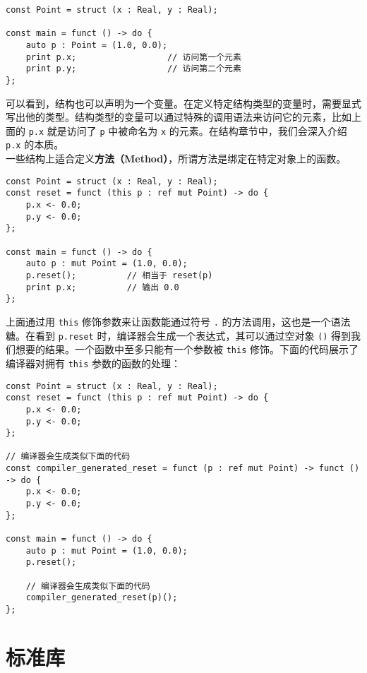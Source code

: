 \begin{lstlisting}
const Point = struct (x : Real, y : Real);

const main = funct () -> do {
    auto p : Point = (1.0, 0.0);
    print p.x;					// 访问第一个元素
    print p.y;					// 访问第二个元素
};
\end{lstlisting}

可以看到，结构也可以声明为一个变量。在定义特定结构类型的变量时，需要显式写出他的类型。结构类型的变量可以通过特殊的调用语法来访问它的元素，比如上面的 \lstinline!p.x! 就是访问了 \lstinline!p! 中被命名为 \lstinline!x! 的元素。在结构章节中，我们会深入介绍 \lstinline!p.x! 的本质。 \\

一些结构上适合定义\textbf{方法（Method）}，所谓方法是绑定在特定对象上的函数。

\begin{lstlisting}
const Point = struct (x : Real, y : Real);
const reset = funct (this p : ref mut Point) -> do {
    p.x <- 0.0;
    p.y <- 0.0;
};

const main = funct () -> do {
    auto p : mut Point = (1.0, 0.0);
    p.reset();			// 相当于 reset(p)
    print p.x;          // 输出 0.0
};
\end{lstlisting}

上面通过用 \lstinline!this! 修饰参数来让函数能通过符号 \lstinline!.! 的方法调用，这也是一个语法糖。在看到 \lstinline!p.reset! 时，编译器会生成一个表达式，其可以通过空对象 \lstinline!()! 得到我们想要的结果。一个函数中至多只能有一个参数被 \lstinline!this! 修饰。下面的代码展示了编译器对拥有 \lstinline!this! 参数的函数的处理：

\begin{lstlisting}
const Point = struct (x : Real, y : Real);
const reset = funct (this p : ref mut Point) -> do {
	p.x <- 0.0;
	p.y <- 0.0;
};

// 编译器会生成类似下面的代码
const compiler_generated_reset = funct (p : ref mut Point) -> funct () -> do {
	p.x <- 0.0;
	p.y <- 0.0;
};

const main = funct () -> do {
	auto p : mut Point = (1.0, 0.0);
	p.reset();
	
	// 编译器会生成类似下面的代码
	compiler_generated_reset(p)();
};
\end{lstlisting}


\section{标准库}

